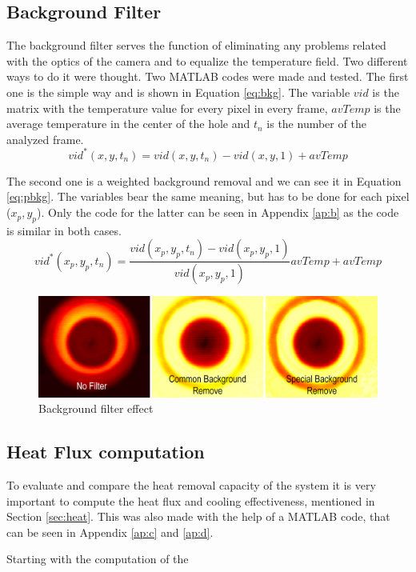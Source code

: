 \subsection{Background Filter}
\par The background filter serves the function of eliminating any problems related with the optics of the camera and to equalize the temperature field. Two different ways to do it were thought. Two MATLAB codes were made and tested. The first one is the simple way and is shown in Equation \ref{eq:bkg}. The variable $vid$ is the matrix with the temperature value for every pixel in every frame, $avTemp$ is the average temperature in the center of the hole and $t_n$ is the number of the analyzed frame.
\begin{equation}\label{eq:bkg}
vid^{*}(x,y,t_n)=vid(x,y,t_n)-vid(x,y,1)+avTemp
\end{equation}
\par The second one is a weighted background removal and we can see it in Equation \ref{eq:pbkg}. The variables bear the same meaning, but has to be done for each pixel ($x_p,y_p$). Only the code for the latter can be seen in Appendix \ref{ap:b} as the code is similar in both cases. 
\begin{equation}\label{eq:pbkg}
vid^{*}(x_p,y_p,t_n)=\frac{vid(x_p,y_p,t_n)-vid(x_p,y_p,1)}{vid(x_p,y_p,1)}avTemp+avTemp
\end{equation}
\begin{figure}[h]
\centering
\includegraphics[width=0.8\linewidth]{Figures/4.Chapter/bkg.png}
\caption{Background filter effect}
\label{fig:bkg}
\end{figure}

\subsection{Heat Flux computation}

\par To evaluate and compare the heat removal capacity of the system it is very important to compute the heat flux and cooling effectiveness, mentioned in Section \ref{sec:heat}. This was also made with the help of a MATLAB code, that can be seen in Appendix \ref{ap:c} and \ref{ap:d}.\\
\par Starting with the computation of the
